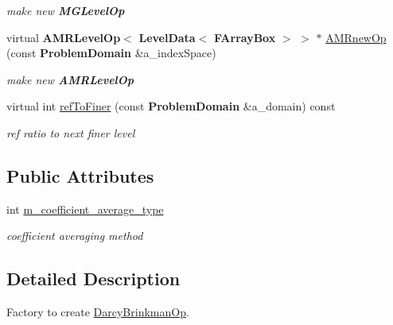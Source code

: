 \begin{DoxyCompactItemize}
\begin{DoxyCompactList}\small\item\em make new \textbf{ M\+G\+Level\+Op} \end{DoxyCompactList}\item 
\mbox{\label{class_darcy_brinkman_op_factory_a82a0943e3ec0acaa1954c1f4c3e3bfa7}} 
virtual \textbf{ A\+M\+R\+Level\+Op}$<$ \textbf{ Level\+Data}$<$ \textbf{ F\+Array\+Box} $>$ $>$ $\ast$ \hyperlink{class_darcy_brinkman_op_factory_a82a0943e3ec0acaa1954c1f4c3e3bfa7}{A\+M\+Rnew\+Op} (const \textbf{ Problem\+Domain} \&a\+\_\+index\+Space)
\begin{DoxyCompactList}\small\item\em make new \textbf{ A\+M\+R\+Level\+Op} \end{DoxyCompactList}\item 
\mbox{\label{class_darcy_brinkman_op_factory_a20448a6f040bdac22873bea2b20b2699}} 
virtual int \hyperlink{class_darcy_brinkman_op_factory_a20448a6f040bdac22873bea2b20b2699}{ref\+To\+Finer} (const \textbf{ Problem\+Domain} \&a\+\_\+domain) const
\begin{DoxyCompactList}\small\item\em ref ratio to next finer level \end{DoxyCompactList}\end{DoxyCompactItemize}
\subsection*{Public Attributes}
\begin{DoxyCompactItemize}
\item 
\mbox{\label{class_darcy_brinkman_op_factory_a02ce1a05ae4fba39abdc0c37ebd8afd8}} 
int \hyperlink{class_darcy_brinkman_op_factory_a02ce1a05ae4fba39abdc0c37ebd8afd8}{m\+\_\+coefficient\+\_\+average\+\_\+type}
\begin{DoxyCompactList}\small\item\em coefficient averaging method \end{DoxyCompactList}\end{DoxyCompactItemize}


\subsection{Detailed Description}
Factory to create \hyperlink{class_darcy_brinkman_op}{Darcy\+Brinkman\+Op}. 

